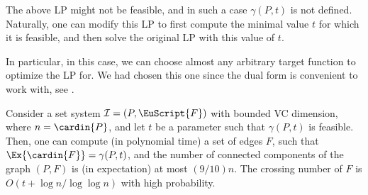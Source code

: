 \documentclass[12pt]{article}
\newcommand{\PntSet}{P}
\newcommand{\Term}[1]{\textsf{#1}}
\newcommand{\LP}{\Term{L{}P}\xspace}
\newcommand{\VC}{\Term{V{C}}\xspace}
\newcommand{\Family}{\EuScript{F}}
\newcommand{\I}{\mathcal{I}}
\begin{document}
\begin{remark}
    The above \LP might not be feasible, and in such a case
    $\gamma(\PntSet, t)$ is not defined. Naturally, one can modify
    this \LP to first compute the minimal value $t$ for which it is
    feasible, and then solve the original \LP with this value of $t$.

    In particular, in this case, we can choose almost any arbitrary
    target function to optimize the \LP for. We had chosen this one
    since the dual form is convenient to work with, see
    .
\end{remark}

\begin{lemma}
    Consider a set system $\I = (\PntSet, \Family)$ with bounded \VC
    dimension, where $n = \cardin{\PntSet}$, and let $t$ be a
    parameter such that $\gamma(\PntSet,t)$ is feasible. Then, one can
    compute (in polynomial time) a set of edges $F$, such that
    $\Ex{\cardin{F}} = \gamma(\PntSet,t)$, and the number of connected
    components of the graph $(\PntSet, F)$ is (in expectation) at most
    $(9/10)n$.  The crossing number of $F$ is $O( t + \log n / \log
    \log n)$ with high probability.

\end{lemma}
\end{document}
